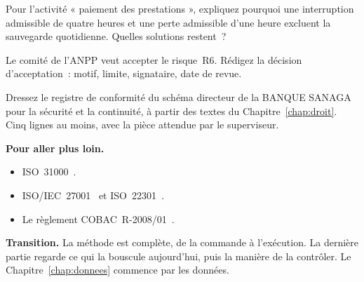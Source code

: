 \begin{boxexo}[title={\ding{45}\quad Exercice~14.2. Le bilan d'impact \niveaumoyen}]
Pour l'activité « paiement des prestations », expliquez pourquoi une interruption admissible de quatre heures et une perte admissible d'une heure excluent la sauvegarde quotidienne. Quelles solutions restent~?
\end{boxexo}

\begin{boxexo}[title={\ding{45}\quad Exercice~14.3. Accepter \niveaumoyen}]
Le comité de l'ANPP veut accepter le risque~R6. Rédigez la décision d'acceptation~: motif, limite, signataire, date de revue.
\end{boxexo}

\begin{boxexo}[title={\ding{45}\quad Exercice~14.4. La banque \niveauexpert}]
Dressez le registre de conformité du schéma directeur de la BANQUE SANAGA pour la sécurité et la continuité, à partir des textes du Chapitre~\ref{chap:droit}. Cinq lignes au moins, avec la pièce attendue par le superviseur.
\end{boxexo}

\bigskip

\begin{boxinfo}
\textbf{Pour aller plus loin.}
\begin{itemize}
    \item ISO~31000~\cite{iso31000}.
    \item ISO/IEC~27001~\cite{iso27001} et ISO~22301~\cite{iso22301}.
    \item Le règlement COBAC~R-2008/01~\cite{cobac200801}.
\end{itemize}
\end{boxinfo}

\begin{boxinfo}
\textbf{Transition.} La méthode est complète, de la commande à l'exécution. La dernière partie regarde ce qui la bouscule aujourd'hui, puis la manière de la contrôler. Le Chapitre~\ref{chap:donnees} commence par les données.
\end{boxinfo}
